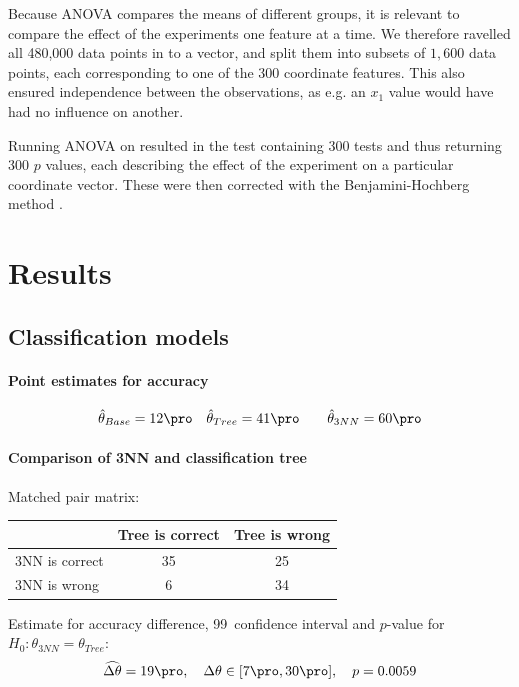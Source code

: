 \documentclass[11pt,fleqn]{article}
\begin{document}
Because ANOVA compares the means of different groups, it is relevant to compare the effect of the experiments one feature at a time.
We therefore ravelled all 480,000 data points in to a vector, and split them into subsets of $ 1,600 $ data points, each corresponding to one of the $ 300 $ coordinate features.
This also ensured independence between the observations, as e.g. an $ x_1 $ value would have had no influence on another.

Running ANOVA on resulted in the test containing 300 tests and thus returning 300 $ p $ values, each describing the effect of the experiment on a particular coordinate vector. These were then corrected with the Benjamini-Hochberg method \cite{BH}.


\section{Results}

\subsection{Classification models}

\paragraph{Point estimates for accuracy}

\begin{align*}
	& \hat \theta_{Base}= 12\pro 
	&& \hat \theta_{Tree} =41\pro 
	&&&\hat \theta_{3NN} = 60 \pro 
\end{align*}
\paragraph{Comparison of 3NN and classification tree}
Matched pair matrix:

\begin{table}[H]
	\centering
	\begin{tabular}{l|c c}
		&Tree is correct& Tree is wrong \\
		\hline
		3NN is correct &35& 25\\
		3NN is wrong& 6& 34
	\end{tabular}
\end{table}\noindent 
Estimate for accuracy difference, 99\pro\ confidence interval and \(p\)-value for \(H_0: \theta_{3NN}=\theta_{Tree}\):
\[
\widehat{\Delta \theta} = 19\pro,\quad  \Delta \theta\in[7\pro , 30\pro], \quad p = 0.0059 
\]
\end{document}
